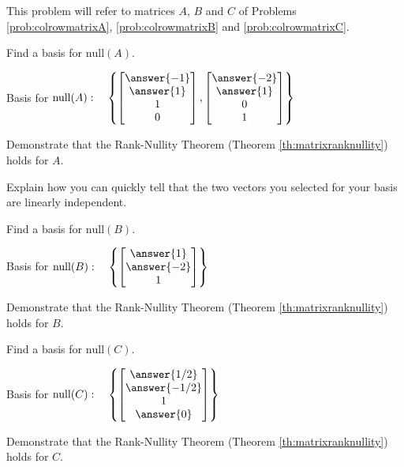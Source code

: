 \documentclass{ximera}
\begin{document}
\begin{problem}
This problem will refer to matrices $A$, $B$ and $C$ of Problems \ref{prob:colrowmatrixA}, \ref{prob:colrowmatrixB} and \ref{prob:colrowmatrixC}.

\begin{problem}
Find a basis for $\mbox{null}(A)$.

Basis for $\mbox{null}(A):\quad \left\{ \begin{bmatrix}\answer{-1}\\\answer{1}\\1\\0\end{bmatrix}, \begin{bmatrix}\answer{-2}\\\answer{1}\\0\\1\end{bmatrix}\right\}$

Demonstrate that the Rank-Nullity Theorem (Theorem \ref{th:matrixranknullity}) holds for $A$.

Explain how you can quickly tell that the two vectors you selected for your basis are linearly independent.
\end{problem}

\begin{problem}
Find a basis for $\mbox{null}(B)$.

Basis for $\mbox{null}(B):\quad \left\{ \begin{bmatrix}\answer{1}\\\answer{-2}\\1\end{bmatrix}\right\}$

Demonstrate that the Rank-Nullity Theorem (Theorem \ref{th:matrixranknullity}) holds for $B$.
\end{problem}

\begin{problem}
Find a basis for $\mbox{null}(C)$.

Basis for $\mbox{null}(C):\quad \left\{ \begin{bmatrix}\answer{1/2}\\\answer{-1/2}\\1\\\answer{0}\end{bmatrix}\right\}$

Demonstrate that the Rank-Nullity Theorem (Theorem \ref{th:matrixranknullity}) holds for $C$.
\end{problem}

\end{problem}
\end{document}
